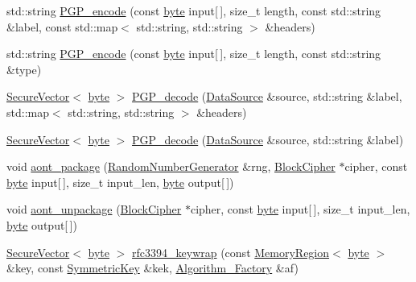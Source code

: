 \begin{DoxyCompactItemize}
\item 
std\-::string \hyperlink{namespaceBotan_a18e0ba5ee5db31642293aeaea51439c6}{P\-G\-P\-\_\-encode} (const \hyperlink{namespaceBotan_a7d793989d801281df48c6b19616b8b84}{byte} input\mbox{[}$\,$\mbox{]}, size\-\_\-t length, const std\-::string \&label, const std\-::map$<$ std\-::string, std\-::string $>$ \&headers)
\item 
std\-::string \hyperlink{namespaceBotan_a9dc039a60e973a85362dd0cb7d7a00ee}{P\-G\-P\-\_\-encode} (const \hyperlink{namespaceBotan_a7d793989d801281df48c6b19616b8b84}{byte} input\mbox{[}$\,$\mbox{]}, size\-\_\-t length, const std\-::string \&type)
\item 
\hyperlink{classBotan_1_1SecureVector}{Secure\-Vector}$<$ \hyperlink{namespaceBotan_a7d793989d801281df48c6b19616b8b84}{byte} $>$ \hyperlink{namespaceBotan_a8f4e98582d92e52086eb8661eca7fe06}{P\-G\-P\-\_\-decode} (\hyperlink{classBotan_1_1DataSource}{Data\-Source} \&source, std\-::string \&label, std\-::map$<$ std\-::string, std\-::string $>$ \&headers)
\item 
\hyperlink{classBotan_1_1SecureVector}{Secure\-Vector}$<$ \hyperlink{namespaceBotan_a7d793989d801281df48c6b19616b8b84}{byte} $>$ \hyperlink{namespaceBotan_aa7e9625a1c5b2a9b55ba3eaab984b241}{P\-G\-P\-\_\-decode} (\hyperlink{classBotan_1_1DataSource}{Data\-Source} \&source, std\-::string \&label)
\item 
void \hyperlink{namespaceBotan_a63bcc8fadddc50158f406c6470dad8ba}{aont\-\_\-package} (\hyperlink{classBotan_1_1RandomNumberGenerator}{Random\-Number\-Generator} \&rng, \hyperlink{classBotan_1_1BlockCipher}{Block\-Cipher} $\ast$cipher, const \hyperlink{namespaceBotan_a7d793989d801281df48c6b19616b8b84}{byte} input\mbox{[}$\,$\mbox{]}, size\-\_\-t input\-\_\-len, \hyperlink{namespaceBotan_a7d793989d801281df48c6b19616b8b84}{byte} output\mbox{[}$\,$\mbox{]})
\item 
void \hyperlink{namespaceBotan_a0c75d5e72f79fa7ec9e091918a66695b}{aont\-\_\-unpackage} (\hyperlink{classBotan_1_1BlockCipher}{Block\-Cipher} $\ast$cipher, const \hyperlink{namespaceBotan_a7d793989d801281df48c6b19616b8b84}{byte} input\mbox{[}$\,$\mbox{]}, size\-\_\-t input\-\_\-len, \hyperlink{namespaceBotan_a7d793989d801281df48c6b19616b8b84}{byte} output\mbox{[}$\,$\mbox{]})
\item 
\hyperlink{classBotan_1_1SecureVector}{Secure\-Vector}$<$ \hyperlink{namespaceBotan_a7d793989d801281df48c6b19616b8b84}{byte} $>$ \hyperlink{namespaceBotan_aa8a9f45ef1aa8cc1623b8ab2e48edad7}{rfc3394\-\_\-keywrap} (const \hyperlink{classBotan_1_1MemoryRegion}{Memory\-Region}$<$ \hyperlink{namespaceBotan_a7d793989d801281df48c6b19616b8b84}{byte} $>$ \&key, const \hyperlink{namespaceBotan_a00c78597211d5c63b63e2a57ddb96d38}{Symmetric\-Key} \&kek, \hyperlink{classBotan_1_1Algorithm__Factory}{Algorithm\-\_\-\-Factory} \&af)

\end{DoxyCompactItemize}
